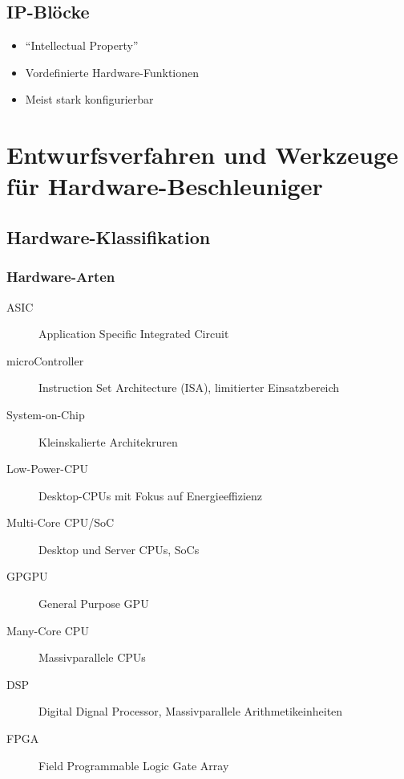 \documentclass[a4paper, 11pt, accentcolor = tud3b]{tudreport}
\begin{document}
		\section{IP-Blöcke}
			\begin{itemize}
				\item \enquote{Intellectual Property}
				\item Vordefinierte Hardware-Funktionen
				\item Meist stark konfigurierbar
			\end{itemize}
    
    \chapter{Entwurfsverfahren und Werkzeuge für Hardware-Beschleuniger}
		\section{Hardware-Klassifikation}
			\subsection{Hardware-Arten}
				\begin{description}
					\item[ASIC] Application Specific Integrated Circuit
					\item[microController] Instruction Set Architecture (ISA), limitierter Einsatzbereich
					\item[System-on-Chip] Kleinskalierte Architekruren
					\item[Low-Power-CPU] Desktop-CPUs mit Fokus auf Energieeffizienz
					\item[Multi-Core CPU/SoC] Desktop und Server CPUs, SoCs
					\item[GPGPU] General Purpose GPU
					\item[Many-Core CPU] Massivparallele CPUs
					\item[DSP] Digital Dignal Processor, Massivparallele Arithmetikeinheiten
					\item[FPGA] Field Programmable Logic Gate Array
				\end{description}
			
\end{document}
